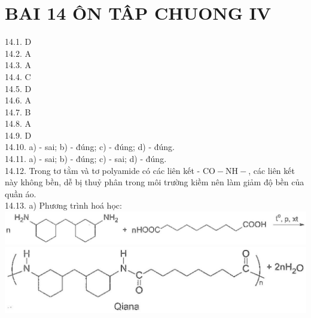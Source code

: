 \documentclass[10pt]{article}
\begin{document}
\section*{BAI 14 ÔN TÂP CHUONG IV}
14.1. D\\
14.2. A\\
14.3. A\\
14.4. C\\
14.5. D\\
14.6. A\\
14.7. B\\
14.8. A\\
14.9. D\\
14.10. a) - sai; b) - đúng; c) - đúng; d) - đúng.\\
14.11. a) - sai; b) - đúng; c) - sai; d) - đúng.\\
14.12. Trong tơ tằm và tơ polyamide có các liên kết - $\mathrm{CO}-\mathrm{NH}-$, các liên kết này không bền, dễ bị thuỷ phân trong môi trường kiềm nên làm giảm độ bền của quần áo.\\
14.13. a) Phương trình hoá học:\\
\includegraphics[max width=\textwidth, center]{2025_10_23_b82d44049ffb48e891e8g-16}\\
\includegraphics[max width=\textwidth, center]{2025_10_23_b82d44049ffb48e891e8g-16(1)}
\end{document}
